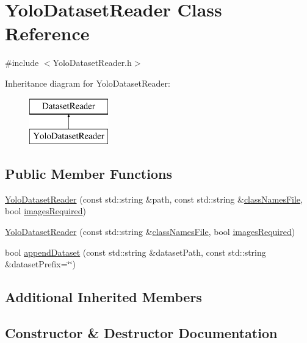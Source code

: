 \hypertarget{class_yolo_dataset_reader}{}\section{Yolo\+Dataset\+Reader Class Reference}
\label{class_yolo_dataset_reader}


{\ttfamily \#include $<$Yolo\+Dataset\+Reader.\+h$>$}

Inheritance diagram for Yolo\+Dataset\+Reader\+:\begin{figure}[H]
\begin{center}
\leavevmode
\includegraphics[height=2.000000cm]{class_yolo_dataset_reader}
\end{center}
\end{figure}
\subsection*{Public Member Functions}
\begin{DoxyCompactItemize}
\item 
\hyperlink{class_yolo_dataset_reader_a3f077b0b1ec33d690e2dbcd3a9942217}{Yolo\+Dataset\+Reader} (const std\+::string \&path, const std\+::string \&\hyperlink{class_dataset_reader_a45ded43b56539f1e37a24ca9c94b4611}{class\+Names\+File}, bool \hyperlink{class_dataset_reader_a71d04d25d58e0e9a0c05d69afcff03a1}{images\+Required})
\item 
\hyperlink{class_yolo_dataset_reader_a2419e2bae31ff7b7511a9d5400568a6d}{Yolo\+Dataset\+Reader} (const std\+::string \&\hyperlink{class_dataset_reader_a45ded43b56539f1e37a24ca9c94b4611}{class\+Names\+File}, bool \hyperlink{class_dataset_reader_a71d04d25d58e0e9a0c05d69afcff03a1}{images\+Required})
\item 
bool \hyperlink{class_yolo_dataset_reader_adabb18f657d4e0dc7b03f7f1b77eb452}{append\+Dataset} (const std\+::string \&dataset\+Path, const std\+::string \&dataset\+Prefix=\char`\"{}\char`\"{})
\end{DoxyCompactItemize}
\subsection*{Additional Inherited Members}


\subsection{Constructor \& Destructor Documentation}
\mbox{\label{class_yolo_dataset_reader_a3f077b0b1ec33d690e2dbcd3a9942217}} 
